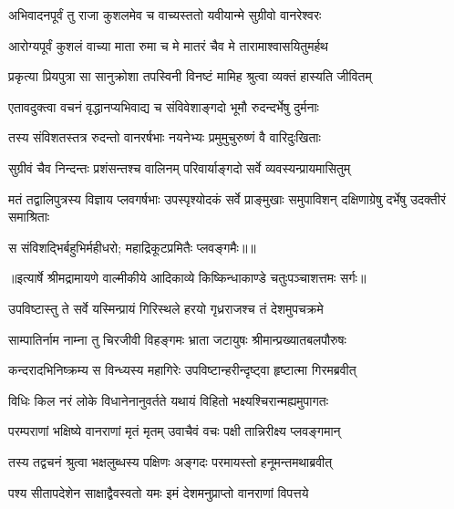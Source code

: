 \twolineshloka
{अभिवादनपूर्वं तु राजा कुशलमेव च}
{वाच्यस्ततो यवीयान्मे सुग्रीवो वानरेश्वरः} %

\twolineshloka
{आरोग्यपूर्वं कुशलं वाच्या माता रुमा च मे}
{मातरं चैव मे तारामाश्वासयितुमर्हथ} %

\twolineshloka
{प्रकृत्या प्रियपुत्रा सा सानुक्रोशा तपस्विनी}
{विनष्टं मामिह श्रुत्वा व्यक्तं हास्यति जीवितम्} %

\twolineshloka
{एतावदुक्त्वा वचनं वृद्धानप्यभिवाद्य च}
{संविवेशाङ्गदो भूमौ रुदन्दर्भेषु दुर्मनाः} %

\twolineshloka
{तस्य संविशतस्तत्र रुदन्तो वानरर्षभाः}
{नयनेभ्यः प्रमुमुचुरुष्णं वै वारिदुःखिताः} %

\twolineshloka
{सुग्रीवं चैव निन्दन्तः प्रशंसन्तश्च वालिनम्}
{परिवार्याङ्गदो सर्वे व्यवस्यन्प्रायमासितुम्} %

\threelineshloka
{मतं तद्वालिपुत्रस्य विज्ञाय प्लवगर्षभाः}
{उपस्पृश्योदकं सर्वे प्राङ्मुखाः समुपाविशन्}
{दक्षिणाग्रेषु दर्भेषु उदक्तीरं समाश्रिताः} %

{स संविशद्भिर्बहुभिर्महीधरो; महाद्रिकूटप्रमितैः प्लवङ्गमैः॥॥} %

\addtocounter{shlokacount}{1}


{॥इत्यार्षे श्रीमद्रामायणे वाल्मीकीये आदिकाव्ये किष्किन्धाकाण्डे चतुःपञ्चाशत्तमः सर्गः॥}


\twolineshloka
{उपविष्टास्तु ते सर्वे यस्मिन्प्रायं गिरिस्थले}
{हरयो गृध्रराजश्च तं देशमुपचक्रमे} %

\twolineshloka
{साम्पातिर्नाम नाम्ना तु चिरजीवी विहङ्गमः}
{भ्राता जटायुषः श्रीमान्प्रख्यातबलपौरुषः} %

\twolineshloka
{कन्दरादभिनिष्क्रम्य स विन्ध्यस्य महागिरेः}
{उपविष्टान्हरीन्दृष्ट्वा हृष्टात्मा गिरमब्रवीत्} %

\twolineshloka
{विधिः किल नरं लोके विधानेनानुवर्तते}
{यथायं विहितो भक्ष्यश्चिरान्मह्यमुपागतः} %

\twolineshloka
{परम्पराणां भक्षिष्ये वानराणां मृतं मृतम्}
{उवाचैवं वचः पक्षी तान्निरीक्ष्य प्लवङ्गमान्} %

\twolineshloka
{तस्य तद्वचनं श्रुत्वा भक्षलुब्धस्य पक्षिणः}
{अङ्गदः परमायस्तो हनूमन्तमथाब्रवीत्} %

\twolineshloka
{पश्य सीतापदेशेन साक्षाद्वैवस्वतो यमः}
{इमं देशमनुप्राप्तो वानराणां विपत्तये} %

